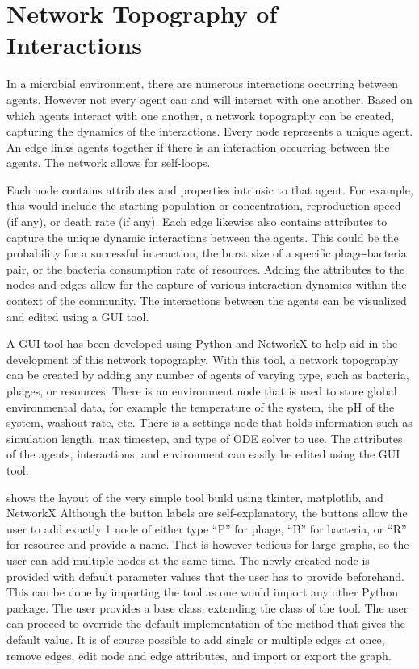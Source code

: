 \section{Network Topography of Interactions}
In a microbial environment, there are numerous interactions occurring between agents. 
However not every agent can and will interact with one another.
Based on which agents interact with one another, a network topography can be created, capturing the dynamics of the interactions.
Every node represents a unique agent. 
An edge links agents together if there is an interaction occurring between the agents.  
The network allows for self-loops. 

Each node contains attributes and properties intrinsic to that agent. 
For example, this would include the starting population or concentration, reproduction speed (if any), or death rate (if any). 
Each edge likewise also contains attributes to capture the unique dynamic interactions between the agents. 
This could be the probability for a successful interaction, the burst size of a specific phage-bacteria pair, or the bacteria consumption rate of resources. 
Adding the attributes to the nodes and edges allow for the capture of various interaction dynamics within the context of the community. 
The interactions between the agents can be visualized and edited using a GUI tool. \newline 

A GUI tool has been developed using Python and NetworkX to help aid in the development of this network topography. 
With this tool, a network topography can be created by adding any number of agents of varying type, such as bacteria, phages, or resources.
There is an environment node that is used to store global environmental data, for example the temperature of the system, the pH of the system, washout rate, etc.
There is a settings node that holds information such as simulation length, max timestep, and type of ODE solver to use. 
The attributes of the agents, interactions, and environment can easily be edited using the GUI tool. \newline 

 shows the layout of the very simple tool build using tkinter, matplotlib, and NetworkX %
Although the button labels are self-explanatory, the buttons allow the user to add exactly 1 node of either type “P” for phage, “B” for bacteria, or “R” for resource and provide a name. 
That is however tedious for large graphs, so the user can add multiple nodes at the same time. 
The newly created node is provided with default parameter values that the user has to provide beforehand. 
This can be done by importing the tool as one would import any other Python package. 
The user provides a base class, extending the class of the tool. 
The user can proceed to override the default implementation of the method that gives the default value. 
It is of course possible to add single or multiple edges at once, remove edges, edit node and edge attributes, and import or export the graph. 

